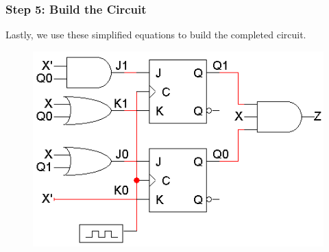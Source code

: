 \subsubsection{Step 5: Build the Circuit}
\label{subsubsec:step5-build-the-circuit}

Lastly, we use these simplified equations to build the completed circuit.
\begin{figure}[H]
  \centering
  \includegraphics[width=\linewidth]{img/design-example-circuit.png}
\end{figure}